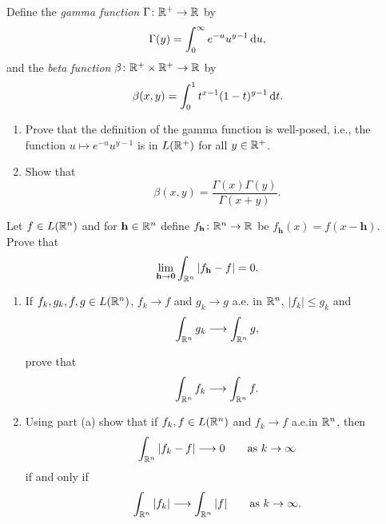 \begin{problem}
  Define the \emph{gamma function} \(\Gamma\colon\mathbb{R}^+\to\mathbb{R}\) by
  \[
    \Gamma(y)=\int_0^\infty e^{-u}u^{y-1}\mathop{}\!\mathrm{d} u,
  \]
  and the \emph{beta function} \(\beta\colon\mathbb{R}^+\times\mathbb{R}^+\to\mathbb{R}\) by
  \[
    \beta(x,y)=\int_0^1 t^{x-1}(1-t)^{y-1}\mathop{}\!\mathrm{d} t.
  \]
  \begin{enumerate}[label=(\alph*)]
  \item Prove that the definition of the gamma function is well-posed,
    i.e., the function \(u\mapsto e^{-u}u^{y-1}\) is in \(L(\mathbb{R}^+)\) for
    all \(y\in\mathbb{R}^+\).
  \item Show that
    \[
      \beta(x,y)=\frac{\Gamma(x)\Gamma(y)}{\Gamma(x+y)}.
    \]
  \end{enumerate}
\end{problem}
\begin{solution}
\end{solution}

\begin{problem}
  Let \(f\in L(\mathbb{R}^n)\) and for \(\mathbf{h}\in\mathbb{R}^n\) define
  \(f_{\mathbf{h}}\colon\mathbb{R}^n\to\mathbb{R}\) be
  \(f_{\mathbf{h}}( x )= f( x -\mathbf{h})\). Prove that
  \[
    \lim_{\mathbf{h}\to\mathbf{0}}\int_{\mathbb{R}^n}\left|f_{\mathbf{h}}-f\right|=0.
  \]
\end{problem}
\begin{solution}
\end{solution}

\begin{problem}
\begin{enumerate}[label=(\alph*)]
\item If \(f_k,g_k,f,g\in L(\mathbb{R}^n)\), \(f_k\to f\) and \(g_k\to g\) a.e.\@
  in \(\mathbb{R}^n\), \(|f_k|\leq g_k\) and
  \[
    \int_{\mathbb{R}^n}g_k\longrightarrow\int_{\mathbb{R}^n}g,
  \]

  prove that
  \[
    \int_{\mathbb{R}^n} f_k\longrightarrow\int_{\mathbb{R}^n}f.
  \]
\item Using part (a) show that if \(f_k,f\in L(\mathbb{R}^n)\) and \(f_k\to f\)
  a.e.\@ in \(\mathbb{R}^n\), then
  \[
    \int_{\mathbb{R}^n}|f_k-f|\longrightarrow 0\qquad\text{as \(k\to\infty\)}
  \]
  if and only if
  \[
    \int_{\mathbb{R}^n}|f_k|\longrightarrow\int_{\mathbb{R}^n}|f|\qquad\text{as
      \(k\to\infty\)}.
  \]
\end{enumerate}
\end{problem}
\begin{solution}
\end{solution}

